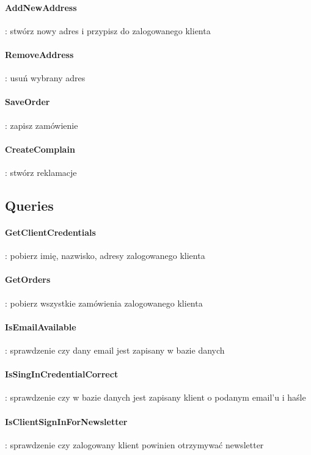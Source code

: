 \documentclass[10pt]{report}
\begin{document}
				\paragraph{AddNewAddress} : stwórz nowy adres i przypisz do zalogowanego klienta
				
				\paragraph{RemoveAddress} : usuń wybrany adres
				
				\paragraph{SaveOrder} : zapisz zamówienie
				
				\paragraph{CreateComplain} : stwórz reklamacje
				
		\subsection{Queries}
			
				\paragraph{GetClientCredentials} : pobierz imię, nazwisko, adresy zalogowanego klienta
				
				\paragraph{GetOrders} : pobierz wszystkie zamówienia zalogowanego klienta 
		
				\paragraph{IsEmailAvailable} : sprawdzenie czy dany email jest zapisany w bazie danych
	
				\paragraph{IsSingInCredentialCorrect} : sprawdzenie czy w bazie danych jest zapisany klient o podanym email’u i haśle
		
				\paragraph{IsClientSignInForNewsletter} : sprawdzenie czy zalogowany klient powinien otrzymywać newsletter
			
\end{document}
